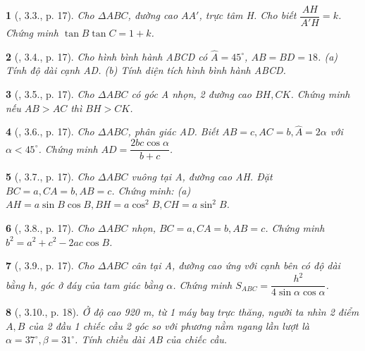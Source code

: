 \documentclass{article}
\newtheorem{baitoan}{}
\begin{document}
\begin{baitoan}[\cite{TLCT_THCS_Toan_9_hinh_hoc}, 3.3., p. 17]
	Cho $\Delta ABC$, đường cao $AA'$, trực tâm H. Cho biết $\dfrac{AH}{A'H} = k$. Chứng minh $\tan B\tan C = 1 + k$.
\end{baitoan}

\begin{baitoan}[\cite{TLCT_THCS_Toan_9_hinh_hoc}, 3.4., p. 17]
	Cho hình bình hành ABCD có $\widehat{A} = 45^\circ$, $AB = BD = 18$. (a) Tính độ dài cạnh AD. (b) Tính diện tích hình bình hành ABCD.
\end{baitoan}

\begin{baitoan}[\cite{TLCT_THCS_Toan_9_hinh_hoc}, 3.5., p. 17]
	Cho $\Delta ABC$ có góc A nhọn, 2 đường cao $BH,CK$. Chứng minh nếu $AB > AC$ thì $BH > CK$.
\end{baitoan}

\begin{baitoan}[\cite{TLCT_THCS_Toan_9_hinh_hoc}, 3.6., p. 17]
	Cho $\Delta ABC$, phân giác AD. Biết $AB = c,AC = b,\widehat{A} = 2\alpha$ với $\alpha < 45^\circ$. Chứng minh $AD = \dfrac{2bc\cos\alpha}{b + c}$.
\end{baitoan}

\begin{baitoan}[\cite{TLCT_THCS_Toan_9_hinh_hoc}, 3.7., p. 17]
	Cho $\Delta ABC$ vuông tại A, đường cao AH. Đặt $BC = a,CA = b,AB = c$. Chứng minh: (a) $AH = a\sin B\cos B,BH = a\cos^2B,CH = a\sin^2B$.
\end{baitoan}

\begin{baitoan}[\cite{TLCT_THCS_Toan_9_hinh_hoc}, 3.8., p. 17]
	Cho $\Delta ABC$ nhọn, $BC = a,CA = b,AB = c$. Chứng minh $b^2 = a^2 + c^2 - 2ac\cos B$.
\end{baitoan}

\begin{baitoan}[\cite{TLCT_THCS_Toan_9_hinh_hoc}, 3.9., p. 17]
	Cho $\Delta ABC$ cân tại A, đường cao ứng với cạnh bên có độ dài bằng $h$, góc ở đáy của tam giác bằng $\alpha$. Chứng minh $S_{ABC} = \dfrac{h^2}{4\sin\alpha\cos\alpha}$.
\end{baitoan}

\begin{baitoan}[\cite{TLCT_THCS_Toan_9_hinh_hoc}, 3.10., p. 18]
	Ở độ cao {\rm920 m}, từ 1 máy bay trực thăng, người ta nhìn 2 điểm $A,B$ của 2 đầu 1 chiếc cầu 2 góc so với phương nằm ngang lần lượt là $\alpha = 37^\circ,\beta = 31^\circ$. Tính chiều dài AB của chiếc cầu.
\end{baitoan}
\end{document}
